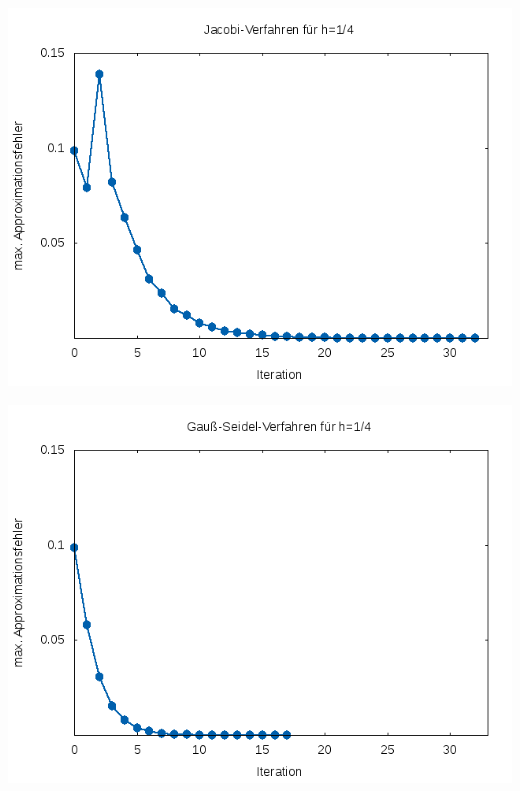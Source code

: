 \documentclass{article}
\begin{document}
\begin{center}
\includegraphics[scale=0.8]{bilder/fehler_jacobi_1_4.png}
\end{center}

\begin{center}
\includegraphics[scale=0.8]{bilder/fehler_gs_1_4.png}
\end{center}
\end{document}
